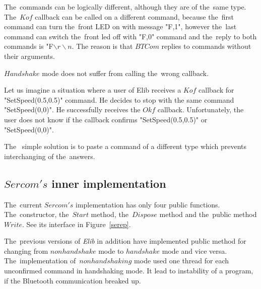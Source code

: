   The~commands can be logically different, although they are of the~same type.
  The~$Kof$ callback can be called on a different command, because the~first command can turn the~front LED on 
  with message "F,1", however the~last command can switch the~front led off with "F,0" command and 
  the~reply to both commands is "F$\backslash r\backslash n$. The reason is that $BTCom$ replies to commands without
  their arguments.

  $Handshake$ mode does not suffer from calling the~wrong callback. 

  \begin{example}
  Let us imagine a situation where a user of Elib receives a $Kof$ callback for "SetSpeed(0.5,0.5)" command.
  He decides to stop with the same command "SetSpeed(0,0)". He successfully receives the $Okf$ callback.
  Unfortunately, the user does not know if the callback confirms "SetSpeed(0.5,0.5)" or "SetSpeed(0,0)".
  \end{example}
  The~ simple solution is to paste a command of a different type which prevents interchanging of the~answers.

\subsection{$Sercom's$ inner implementation}\label{sec:versions}
  The~current $Sercom's$ implementation has only four public functions.
  The~constructor, the~$Start$ method, the~$Dispose$ method and the~public method $Write$. 
  See its interface in Figure~\ref{serep}.	

  The~previous versions of {\it Elib} in addition have implemented public 
  method for changing from $nonhandshake$ mode to 
  $handshake$ mode and vice versa.
  The~implementation of~$nonhandshaking$ mode used one 
  thread for each unconfirmed command in handshaking mode.
  It lead to instability of a program, if the Bluetooth communication breaked up.
  

